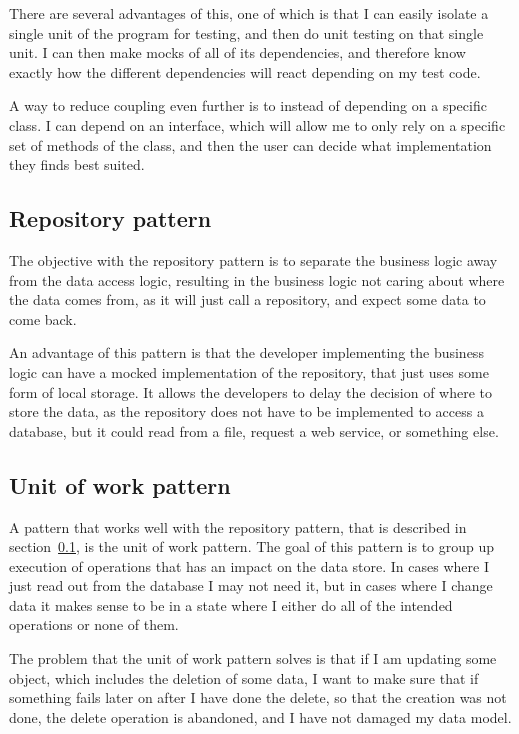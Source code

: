 There are several advantages of this, one of which is that I can easily isolate
a single unit of the program for testing, and then do unit testing on that
single unit. I can then make mocks of all of its dependencies, and therefore
know exactly how the different dependencies will react depending on my test
code\cite{dependency_injection}. 

A way to reduce coupling even further is to instead of depending on a specific
class. I can depend on an interface, which will allow me to only rely on a
specific set of methods of the class, and then the user can decide what
implementation they finds best suited. 

\subsection{Repository pattern}
\label{sub:Repository pattern}
The objective with the repository pattern is to separate the business logic away
from the data access logic, resulting in the business logic not caring about
where the data comes from, as it will just call a repository, and expect some
data to come back. 

An advantage of this pattern is that the developer implementing the business
logic can have a mocked implementation of the repository, that just uses some
form of local storage. It allows the developers to delay the decision of where
to store the data, as the repository does not have to be implemented to access a
database, but it could read from a file, request a web service, or something
else\cite{repository_pattern}. 

\subsection{Unit of work pattern}
\label{sub:Unit of work pattern}
A pattern that works well with the repository pattern, that is described in
section~\ref{sub:Repository pattern}, is the unit of work pattern. The goal of
this pattern is to group up execution of operations that has an impact on the
data store. In cases where I just read out from the database I may not need it,
but in cases where I change data it makes sense to be in a state where I either
do all of the intended operations or none of them. 

The problem that the unit of work pattern solves is that if I am updating some
object, which includes the deletion of some data, I want to make sure that if
something fails later on after I have done the delete, so that the creation was
not done, the delete operation is abandoned, and I have not damaged my data
model\cite{uow}. 

